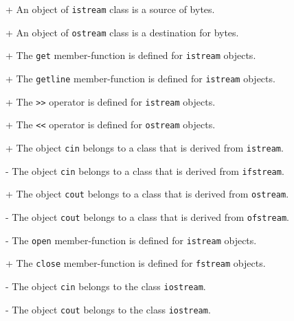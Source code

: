 + An object of \verb|istream| class is a source of bytes.

+ An object of \verb|ostream| class is a destination for bytes.

+ The \verb|get| member-function is defined for \verb|istream| objects.

+ The \verb|getline| member-function is defined for \verb|istream| objects.

+ The \verb|>>| operator is defined for \verb|istream| objects.

+ The \verb|<<| operator is defined for \verb|ostream| objects.

+ The object \verb|cin| belongs to a class that is derived from \verb|istream|.

- The object \verb|cin| belongs to a class that is derived from \verb|ifstream|.

+ The object \verb|cout| belongs to a class that is derived from \verb|ostream|.

- The object \verb|cout| belongs to a class that is derived from \verb|ofstream|.

- The \verb|open| member-function is defined for \verb|istream| objects.

+ The \verb|close| member-function is defined for \verb|fstream| objects.

- The object \verb|cin| belongs to the class \verb|iostream|.

- The object \verb|cout| belongs to the class \verb|iostream|.

